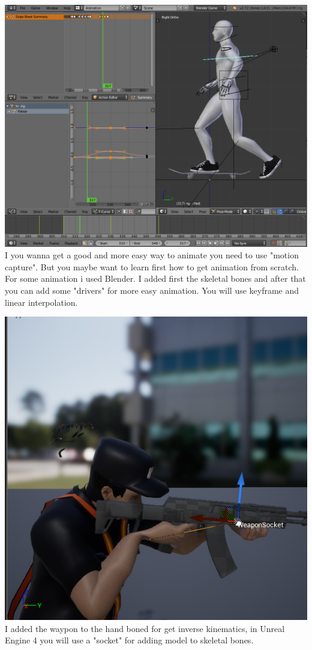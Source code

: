 \documentclass{article}
\begin{document}
  \includegraphics[width=\textwidth]{29.png}
  I you wanna get a good and more easy way to animate you need to use "motion capture". But you maybe want to learn first how to get animation from scratch. For some animation i used Blender. I added first the skeletal bones and after that you can add some "drivers" for more easy animation. You will use keyframe and linear interpolation.
  
  \includegraphics[width=\textwidth]{88.png}
  I added the waypon to the hand boned for get inverse kinematics, in Unreal Engine 4 you will use a "socket" for adding model to skeletal bones.
\end{document}
